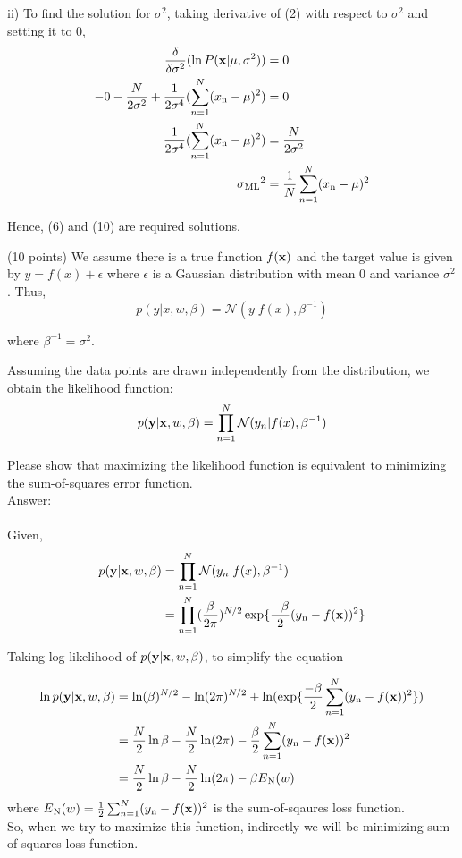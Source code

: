 \documentclass{exam}
\newcommand{\xx}{{\bf{x}}}
\begin{document}
\begin{questions}
ii) To find the solution for $\sigma^2$, taking derivative of (2) with respect to $\sigma^2$ and setting it to 0,
\begin{align}
\frac{\delta}{\delta\sigma^2}(\ln P(\mathbf{x}|\mu,\sigma^2)) &= 0\\
-0-\frac{N}{2\sigma^2}+\frac{1}{2\sigma^4}(\sum_{n=1}^N(x\textsubscript{n}-\mu)^2) &= 0\\
\frac{1}{2\sigma^4}(\sum_{n=1}^N(x\textsubscript{n}-\mu)^2) &=\frac{N}{2\sigma^2}\\
{\sigma\textsubscript{ML}}^2 &= \frac{1}{N}\sum_{n=1}^N(x\textsubscript{n}-\mu)^2
\end{align}

Hence, (6) and (10) are required solutions.


\newpage
{} (10 points) We assume there is a true function $f(\xx)$ and the target value is given by $y=f(x)+\epsilon$ where $\epsilon$ is a Gaussian distribution with mean $0$ and variance $\sigma^2$.
Thus,
$$p(y|x,w,\beta) =\mathcal{N}(y| f(x), \beta^{-1})$$

where $\beta^{-1} = \sigma^2$.

Assuming the data points are drawn independently from the distribution, we obtain the likelihood function:
$$p(\mathbf{y}|\xx,w,\beta) = \prod_{n=1}^N \mathcal{N}(y_n|f(x),\beta^{-1})$$

Please show that maximizing the likelihood function is equivalent to minimizing the sum-of-squares error function. \\ 

Answer:\\ \\
Given,\\
\begin{align}
p(\mathbf{y}|\xx,w,\beta) &= \prod_{n=1}^N \mathcal{N}(y_n|f(x),\beta^{-1})\\
&= \prod_{n=1}^N (\frac{\beta}{2\pi})^{N/2} \exp\{{\frac{-\beta}{2}(y\textsubscript{n}-f(\xx))^2}\}
\end{align}

Taking log likelihood of $p(\mathbf{y}|\xx,w,\beta)$, to simplify the equation

\begin{align}
\ln p(\mathbf{y}|\xx,w,\beta) &= \ln(\beta)^{N/2}-\ln(2\pi)^{N/2}+\ln(\exp\{\frac{-\beta}{2}
\sum_{n=1}^N(y\textsubscript{n}-f(\xx))^2\}) \\
 &=  \frac{N}{2}\ln{\beta}-\frac{N}{2}\ln(2\pi)-\frac{\beta}{2}
\sum_{n=1}^N(y\textsubscript{n}-f(\xx))^2 \\
&=  \frac{N}{2}\ln{\beta}-\frac{N}{2}\ln(2\pi)-\beta E\textsubscript{N}(w)
\end{align}
where $E\textsubscript{N}(w) = \frac{1}{2}\sum_{n=1}^N(y\textsubscript{n}-f(\xx))^2$ is the sum-of-sqaures loss function.\\ So, when we try to maximize this function, indirectly we will be minimizing sum-of-squares loss function.


\end{questions}
\end{document}
